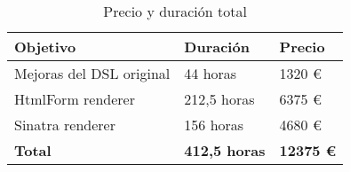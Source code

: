 \begin{table}[!ht]
\begin{center}
\begin{tabular}{|p{80mm}|p{25mm}|p{20mm}|} \hline 
\textbf{Objetivo} & \textbf{Duraci\'on} & \textbf{Precio} \\ \hline

Mejoras del DSL original &
44 horas &
1320 \euro{}
\\
\hline

HtmlForm renderer &
212,5 horas &
6375 \euro{}
\\
\hline

Sinatra renderer &
156 horas &
4680 \euro{}
\\
\hline \hline

{\bfseries Total} &
{\bfseries 412,5 horas} &
{\bfseries 12375 \euro{}}
\\
\hline

\end{tabular}
\end{center}
\caption{Precio y duraci\'on total}
\label{table:resOthers3}
\end{table}
